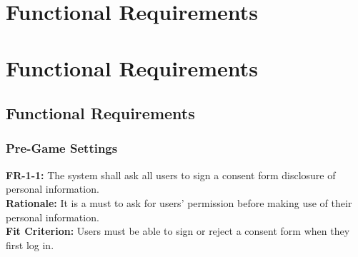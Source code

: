 \documentclass[12pt]{article}
\begin{document}
\section{Functional Requirements}
\section{Functional Requirements}
\subsection{Functional Requirements}
\subsubsection{Pre-Game Settings}
    \textbf{FR-1-1:} The system shall ask all users to sign a consent form disclosure of personal information.\\
    \textbf{Rationale:} It is a must to ask for users' permission before making use of their personal information.\\
    \textbf{Fit Criterion:} Users must be able to sign or reject a consent form when they first log in.\\\\
    
\end{document}
